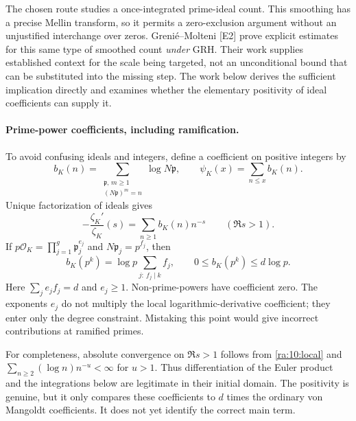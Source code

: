 \documentclass[11pt]{article}
\begin{document}
The chosen route studies a once-integrated prime-ideal count. This smoothing
has a precise Mellin transform, so it permits a zero-exclusion argument
without an unjustified interchange over zeros. Greni\'e--Molteni [E2]
prove explicit estimates for this same type of smoothed count \emph{under}
GRH. Their work supplies established context for the scale being targeted,
not an unconditional bound that can be substituted into the missing step.
The work below derives the sufficient implication directly and examines
whether the elementary positivity of ideal coefficients can supply it.

\paragraph{Prime-power coefficients, including ramification.}
To avoid confusing ideals and integers, define a coefficient on positive
integers by
\[
 b_K(n)=\sum_{\substack{\mathfrak p,\,m\ge1\\(N\mathfrak p)^m=n}}
                 \log N\mathfrak p,
 \qquad \psi_K(x)=\sum_{n\le x}b_K(n).
\]
Unique factorization of ideals gives
\[
 -\frac{\zeta_K'}{\zeta_K}(s)=\sum_{n\ge1}b_K(n)n^{-s}
                   \qquad(\Re s>1).
\]
If $p\mathcal O_K=\prod_{j=1}^g\mathfrak p_j^{e_j}$ and
$N\mathfrak p_j=p^{f_j}$, then
\begin{equation}\label{ra:10:local}
 b_K(p^k)=\log p\sum_{j:\ f_j\mid k}f_j,
 \qquad 0\le b_K(p^k)\le d\log p.
\end{equation}
Here $\sum_j e_jf_j=d$ and $e_j\ge1$. Non-prime-powers have coefficient
zero. The exponents $e_j$ do not multiply the local logarithmic-derivative
coefficient; they enter only the degree constraint. Mistaking this point
would give incorrect contributions at ramified primes.

For completeness, absolute convergence on $\Re s>1$ follows from
\eqref{ra:10:local} and
$\sum_{n\ge2}(\log n)n^{-u}<\infty$ for $u>1$.
Thus differentiation of the Euler product and the integrations below
are legitimate in their initial domain. The positivity is genuine, but it
only compares these coefficients to $d$ times the ordinary von Mangoldt
coefficients. It does not yet identify the correct main term.
\end{document}
